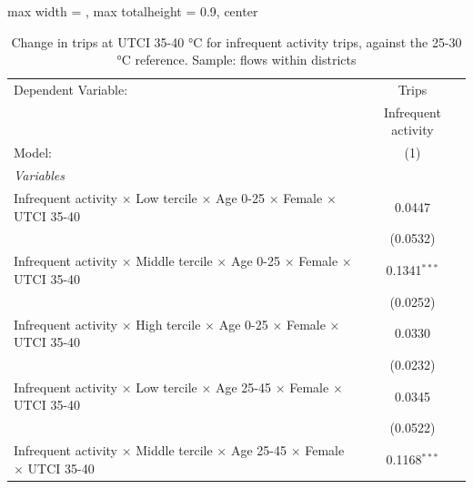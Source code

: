 
\begin{table}[htbp]
   \caption{\label{table_intersectionality_infrequent_activity_35-40} Change in trips at UTCI 35-40 °C for infrequent activity trips, against the 25-30 °C reference. Sample: flows within districts}
   \centering
   \small
   \begin{adjustbox}{max width = \textwidth, max totalheight = 0.9\textheight, center}
      \begin{tabular}{lc}
         \tabularnewline \midrule \midrule
         Dependent Variable:                                                                                     & Trips\\  
                                                                                                                 & Infrequent activity \\   
         Model:                                                                                                  & (1)\\  
         \midrule
         \emph{Variables}\\
         Infrequent activity $\times$ Low tercile $\times$ Age 0-25 $\times$ Female $\times$ UTCI 35-40          & 0.0447\\   
                                                                                                                 & (0.0532)\\   
         Infrequent activity $\times$ Middle tercile $\times$ Age 0-25 $\times$ Female $\times$ UTCI 35-40       & 0.1341$^{***}$\\   
                                                                                                                 & (0.0252)\\   
         Infrequent activity $\times$ High tercile $\times$ Age 0-25 $\times$ Female $\times$ UTCI 35-40         & 0.0330\\   
                                                                                                                 & (0.0232)\\   
         Infrequent activity $\times$ Low tercile $\times$ Age 25-45 $\times$ Female $\times$ UTCI 35-40         & 0.0345\\   
                                                                                                                 & (0.0522)\\   
         Infrequent activity $\times$ Middle tercile $\times$ Age 25-45 $\times$ Female $\times$ UTCI 35-40      & 0.1168$^{***}$\\   

\end{tabular}
\end{adjustbox}
\end{table}
